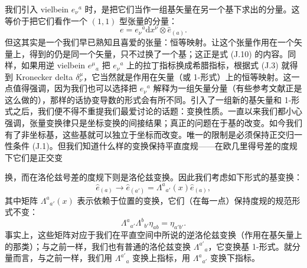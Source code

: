 我们引入 vielbein $e_{\nu}{}^{a}$ 时，是把它们当作一组基矢量在另一个基下求出的分量。这等价于把它们看作一个 $(1,1)$ 型张量的分量：
\begin{equation*}
e = e_{\nu}{}^{a}\mathrm{d}x^{\nu}\otimes\hat{e}_{(a)}.
\tag{J.13}
\end{equation*}
但这其实是一个我们早已熟知且喜爱的张量：恒等映射。让这个张量作用在一个矢量上，得到的仍是同一个矢量，只不过换了一个基；这正是式 (J.10) 的内容。同样，如果用逆 vielbein $e^{\mu}{}_{a}$ 把 $e_{\nu}{}^{a}$ 上的拉丁指标换成希腊指标，根据式 (J.3) 就得到 Kronecker delta $\delta^{\mu}_{\nu}$，它当然就是作用在矢量（或 1-形式）上的恒等映射。这一点值得强调，因为我们也可以选择把 $e_{\nu}{}^{a}$ 解释为一组矢量分量（有些参考文献正是这么做的），那样的话协变导数的形式会有所不同。引入了一组新的基矢量和 1-形式之后，我们便不得不重提我们最爱讨论的话题：变换性质。一直以来我们都小心强调，张量变换律只是坐标变换的间接结果；真正的问题在于基的改变。如今我们有了非坐标基，这些基就可以独立于坐标而改变。唯一的限制是必须保持正交归一性条件 (J.1)。但我们知道什么样的变换保持平直度规——在欧几里得号差的度规下它们是正交变

换，而在洛伦兹号差的度规下则是洛伦兹变换。因此我们考虑如下形式的基变换：
\begin{equation*}
\hat{e}_{(a)} \to \hat{e}_{(a')} = \Lambda^{a}{}_{a'}(x)\hat{e}_{(a)},
\tag{J.14}
\end{equation*}
其中矩阵 $\Lambda^{a}{}_{a'}(x)$ 表示依赖于位置的变换，它们（在每一点）保持度规的规范形式不变：
\begin{equation*}
\Lambda^{a}{}_{a'}\Lambda^{b}{}_{b'}\eta_{ab} = \eta_{a'b'}.
\tag{J.15}
\end{equation*}
事实上，这些矩阵对应于我们在平直空间中所说的逆洛伦兹变换（作用在基矢量上的那类）；与之前一样，我们也有普通的洛伦兹变换 $\Lambda^{a'}{}_{a}$，它变换基 1-形式。就分量而言，与之前一样，我们用 $\Lambda^{a'}{}_{a}$ 变换上指标，用 $\Lambda^{a}{}_{a'}$ 变换下指标。

